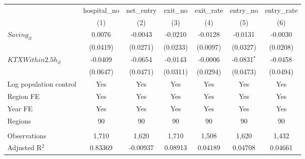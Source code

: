 \begingroup
\centering
\begin{tabular}{lcccccc}
   \toprule
                          & hospital\_no  & net\_entry  & exit\_no  & exit\_rate  & entry\_no     & entry\_rate \\    
                          & (1)           & (2)         & (3)       & (4)         & (5)           & (6)\\  
   \midrule 
   $Saving_{it}$          & 0.0076        & -0.0043     & -0.0210   & -0.0128     & -0.0131       & -0.0030\\   
                          & (0.0419)      & (0.0271)    & (0.0233)  & (0.0097)    & (0.0327)      & (0.0208)\\   
   $KTXWithin2.5h_{it}$   & -0.0409       & -0.0654     & -0.0143   & -0.0006     & -0.0831$^{*}$ & -0.0458\\   
                          & (0.0647)      & (0.0471)    & (0.0311)  & (0.0294)    & (0.0473)      & (0.0494)\\   
   Log population control & Yes           & Yes         & Yes       & Yes         & Yes           & Yes\\  
   Region FE              & Yes           & Yes         & Yes       & Yes         & Yes           & Yes\\  
   Year FE                & Yes           & Yes         & Yes       & Yes         & Yes           & Yes\\  
   Regions                & 90            & 90          & 90        & 90          & 90            & 90\\  
    \\
   Observations           & 1,710         & 1,620       & 1,710     & 1,508       & 1,620         & 1,432\\  
   Adjusted R$^2$         & 0.83369       & -0.00937    & 0.08913   & 0.04189     & 0.04708       & 0.04661\\  
   \bottomrule
\end{tabular}
\par\endgroup
